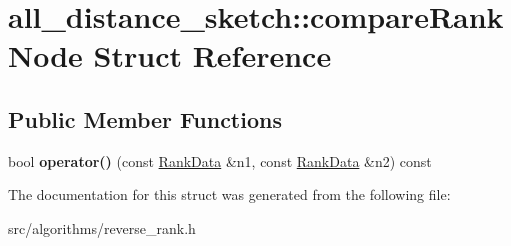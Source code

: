 \hypertarget{structall__distance__sketch_1_1compareRankNode}{}\section{all\+\_\+distance\+\_\+sketch\+:\+:compare\+Rank\+Node Struct Reference}
\label{structall__distance__sketch_1_1compareRankNode}
\subsection*{Public Member Functions}
\begin{DoxyCompactItemize}
\item 
\hypertarget{structall__distance__sketch_1_1compareRankNode_aa21d2e819894d76c254a089a39399671}{}bool {\bfseries operator()} (const \hyperlink{structall__distance__sketch_1_1RankData}{Rank\+Data} \&n1, const \hyperlink{structall__distance__sketch_1_1RankData}{Rank\+Data} \&n2) const \label{structall__distance__sketch_1_1compareRankNode_aa21d2e819894d76c254a089a39399671}

\end{DoxyCompactItemize}


The documentation for this struct was generated from the following file\+:\begin{DoxyCompactItemize}
\item 
src/algorithms/reverse\+\_\+rank.\+h\end{DoxyCompactItemize}
